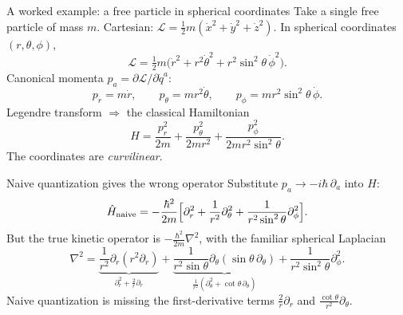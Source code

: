 \documentclass[aspectratio=169,10pt]{beamer}
\newcommand{\stagenum}{0}
\newcommand{\setstage}[1]{\renewcommand{\stagenum}{#1}}
\begin{document}
\begin{frame}{A worked example: a free particle in spherical coordinates}
\setstage{3}
Take a single free particle of mass $m$. Cartesian: $\mathcal L=\tfrac12 m(\dot x^2+\dot y^2+\dot z^2)$. In spherical coordinates $(r,\theta,\phi)$,
\begin{equation*}
\mathcal L=\tfrac12 m\bigl(\dot r^2+r^2\dot\theta^2+r^2\sin^2\theta\,\dot\phi^2\bigr).
\end{equation*}
Canonical momenta $p_a=\partial\mathcal L/\partial\dot q^a$:
\begin{equation*}
p_r=m\dot r,\qquad p_\theta=mr^2\dot\theta,\qquad p_\phi=mr^2\sin^2\theta\,\dot\phi .
\end{equation*}
Legendre transform $\Rightarrow$ the classical Hamiltonian
\begin{equation*}
\boxed{\;H=\frac{p_r^2}{2m}+\frac{p_\theta^2}{2mr^2}+\frac{p_\phi^2}{2mr^2\sin^2\theta}.\;}
\end{equation*}
The coordinates are \emph{curvilinear}.
\end{frame}

\begin{frame}{Naive quantization gives the wrong operator}
\setstage{3}
Substitute $p_a\to-i\hbar\,\partial_a$ into $H$:
\begin{equation*}
\hat H_{\mathrm{naive}}=-\frac{\hbar^2}{2m}\Bigl[\partial_r^2+\frac{1}{r^2}\partial_\theta^2+\frac{1}{r^2\sin^2\theta}\partial_\phi^2\Bigr].
\end{equation*}
But the true kinetic operator is $-\tfrac{\hbar^2}{2m}\nabla^2$, with the familiar spherical Laplacian
\begin{equation*}
\nabla^2=\underbrace{\frac{1}{r^2}\partial_r(r^2\partial_r)}_{\partial_r^2+\frac{2}{r}\partial_r}
+\underbrace{\frac{1}{r^2\sin\theta}\partial_\theta(\sin\theta\,\partial_\theta)}_{\frac{1}{r^2}(\partial_\theta^2+\cot\theta\,\partial_\theta)}
+\frac{1}{r^2\sin^2\theta}\partial_\phi^2 .
\end{equation*}
\alert{Naive quantization is missing the first-derivative terms $\tfrac{2}{r}\partial_r$ and $\tfrac{\cot\theta}{r^2}\partial_\theta$.}
\end{frame}
\end{document}
